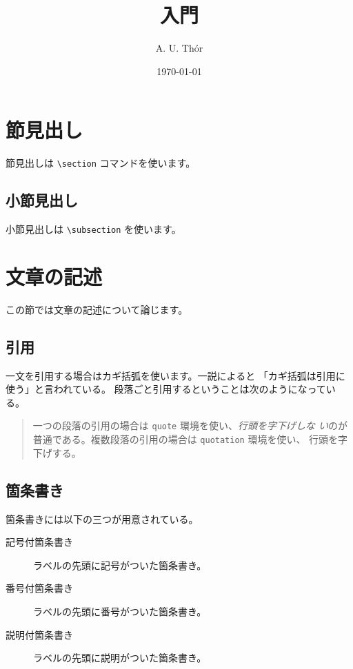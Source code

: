 \documentclass[a4j,12pt,twocolumn]{jsarticle}
\title{\LaTeXe 入門}%
\author{A. U. Th\'or}%
\date{\today}%
\begin{document}
\onecolumn
\maketitle%
\tableofcontents%
%
\section{節見出し}%
節見出しは \verb|\section| コマンドを使います。
%
\subsection{小節見出し}%
小節見出しは \verb|\subsection| を使います。
%
\section{文章の記述}
この節では文章の記述について論じます。
%
\subsection{引用}
一文を引用する場合はカギ括弧を使います。一説によると
「カギ括弧は引用に使う」と言われている。
段落ごと引用するということは次のようになっている。
\begin{quote}
一つの段落の引用の場合は \verb|quote| 環境を使い、\emph{行頭を字下げしな
い}のが普通である。複数段落の引用の場合は \verb|quotation| 環境を使い、
行頭を字下げする。
\end{quote}
%
\subsection{箇条書き}
箇条書きには以下の三つが用意されている。
\begin{description}
 \item[記号付箇条書き] ラベルの先頭に記号がついた箇条書き。
 \item[番号付箇条書き] ラベルの先頭に番号がついた箇条書き。
 \item[説明付箇条書き] ラベルの先頭に説明がついた箇条書き。
\end{description}
%
\end{document}
